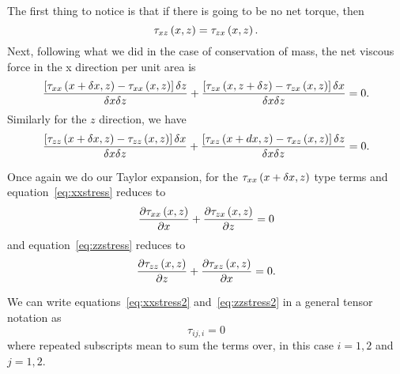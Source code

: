 \documentclass[12pt,twoside]{article}
\begin{document}
The first thing to notice is that if there is going to be no net torque,
then
\begin{equation}
\tau_{xz} \left ( x , z \right ) = \tau_{zx} \left ( x , z \right ).
\end{equation}
Next, following what we did in the case of conservation of mass, 
the net viscous force in the x direction per unit area is
\begin{equation}
{{\left [ \tau_{xx} \left ( x +\delta x , z \right )- \tau_{xx} \left ( x , z \right )\right ] \delta z}\over \delta x\delta z} + 
{{\left [ \tau_{zx} \left ( x , z + \delta z \right ) - \tau_{zx} \left ( x , z \right ) \right ] \delta x}\over \delta x\delta z} = 0.
\label{eq:xxstress}
\end{equation}
Similarly for the $z$ direction, we have
\begin{equation} 
{{\left [ \tau_{zz} \left ( x + \delta x, z \right )- \tau_{zz} \left ( x , z \right )\right ] \delta x}\over \delta x\delta z} + 
{{\left [ \tau_{xz} \left ( x + dx , z \right ) - \tau_{xz} \left ( x , z \right ) \right ] \delta z}\over \delta x\delta z} = 0.
\label{eq:zzstress}
\end{equation}

Once again we do our Taylor expansion, for the $\tau_{xx} \left ( x +\delta x , z \right )$ type terms and
equation~\ref{eq:xxstress} reduces to
\begin{equation}
{{\partial\tau_{xx} \left ( x , z \right )}\over{\partial x}} + {{\partial\tau_{zx} \left ( x , z \right )}\over{\partial z}} =0
\label{eq:xxstress2}
\end{equation}
and equation~\ref{eq:zzstress} reduces to
\begin{equation} 
{{\partial\tau_{zz} \left ( x , z \right )}\over{\partial z}} + {{\partial\tau_{xz} \left ( x , z \right )}\over{\partial x}} =0.
\label{eq:zzstress2}
\end{equation}

We can write equations~\ref{eq:xxstress2} and~\ref{eq:zzstress2} in a general
tensor notation as
\begin{equation}  
\tau_{ij,i} = 0
\end{equation}
where repeated subscripts mean to sum the terms over, in this case $i=1,2$ and
$j=1,2$.
\end{document}
